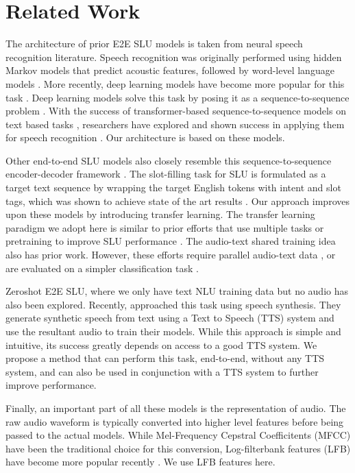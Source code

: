 \documentclass[letterpaper]{article} \usepackage{aaai21}  \usepackage{times}  \usepackage{helvet} \usepackage{courier}  \usepackage[hyphens]{url}  \usepackage{graphicx} \usepackage{booktabs}
\begin{document}
\section{Related Work}
The architecture of prior E2E SLU models is taken from neural speech recognition literature. Speech recognition was originally performed using hidden Markov models that predict acoustic features, followed by word-level language models \cite{Furui2000DigitalSP}. More recently, deep learning models have become more popular for this task \cite{Hinton2012DeepNN}. Deep learning models solve this task by posing it as a sequence-to-sequence problem \cite{Graves2013SpeechRW,Nassif2019SpeechRU}. With the success of transformer-based sequence-to-sequence models on text based tasks \cite{vaswani2017attention}, researchers have explored and shown success in applying them for speech recognition \cite{Mohamed2019TransformersWC,Karita2019ACS}. Our architecture is based on these models.

Other end-to-end SLU models also closely resemble this sequence-to-sequence encoder-decoder framework \cite{Haghani2018FromAT,Lugosch2019SpeechMP}. The slot-filling task for SLU is formulated as a target text sequence by wrapping the target English tokens with intent and slot tags, which was shown to achieve state of the art results \cite{Rongali_2020}. Our approach improves upon these models by introducing transfer learning. The transfer learning paradigm we adopt here is similar to prior efforts that use multiple tasks or pretraining to improve SLU performance \cite{wang2020large,jia2020large}. The audio-text shared training idea also has prior work. However, these efforts require parallel audio-text data \cite{denisov2020pretrained}, or are evaluated on a simpler classification task \cite{sari2020training}.

Zeroshot E2E SLU, where we only have text NLU training data but no audio has also been explored. Recently, \cite{Lugosch2020UsingSS} approached this task using speech synthesis. They generate synthetic speech from text using a Text to Speech (TTS) system and use the resultant audio to train their models. While this approach is simple and intuitive, its success greatly depends on access to a good TTS system. We propose a method that can perform this task, end-to-end, without any TTS system, and can also be used in conjunction with a TTS system to further improve performance.

Finally, an important part of all these models is the representation of audio. The raw audio waveform is typically converted into higher level features before being passed to the actual models. While Mel-Frequency Cepstral Coefficitents (MFCC) have been the traditional choice for this conversion, Log-filterbank features (LFB) have become more popular recently \cite{fayek2016}. We use LFB features here.
\end{document}
